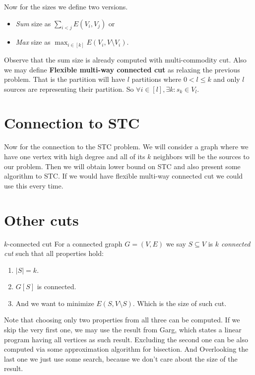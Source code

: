 \documentclass{article}
\begin{document}
	Now for the sizes we define two versions.
	
	\begin{itemize}
		\item \textit{Sum} size as $\sum_{i < j} E(V_i, V_j)$ or
		\item \textit{Max} size as $\max_{i \in[k]} E(V_i, V \setminus V_i)$.
	\end{itemize}
	
	Observe that the sum size is already computed with multi-commodity cut. Also we may define \textbf{Flexible multi-way connected cut} as relaxing the previous problem. That is the partition will have $l$ partitions where $0 < l \leq k$ and only $l$ sources are representing their partition. So $\forall i \in [l] , \exists k : s_k \in V_l$.
	
	\section{Connection to STC}
	
	Now for the connection to the STC problem. We will consider a graph where we have one vertex with high degree and all of its $k$ neighbors will be the sources to our problem. Then we will obtain lower bound on STC and also present some algorithm to STC. If we would have flexible multi-way connected cut we could use this every time.
	
	\section{Other cuts}
	
	\begin{problem}{$k$-connected cut}
		For a connected graph $G = (V,E)$ we say $S \subseteq V$ is \textit{$k$ connected cut} such that all properties hold:
		
		\begin{enumerate}
			\item $|S| = k$.
			\item $G[S]$ is connected. %
			\item And we want to minimize $E(S, V \setminus S)$. Which is the size of such cut.
		\end{enumerate}
	\end{problem}
	
	
	Note that choosing only two properties from all three can be computed. If we skip the very first one, we may use the result from Garg, which states a linear program having all vertices as such result. Excluding the second one can be also computed via some approximation algorithm for bisection. And Overlooking the last one we just use some search, because we don't care about the size of the result.
	
\end{document}
